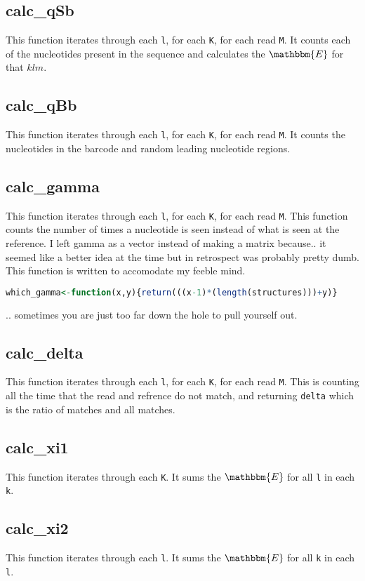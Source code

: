 \documentclass[12pt]{article}
\begin{document}
  \subsection*{calc\_qSb}
This function iterates through each \texttt{l}, for each \texttt{K}, for each read \texttt{M}. It counts each of the nucleotides present in the sequence and calculates the $\mathbbm{E}$ for that $klm$.
  \subsection*{calc\_qBb}
This function iterates through each \texttt{l}, for each \texttt{K}, for each read \texttt{M}. It counts the nucleotides in the barcode and random leading nucleotide regions.
  \subsection*{calc\_gamma}
This function iterates through each \texttt{l}, for each \texttt{K}, for each read \texttt{M}. This function counts the number of times a nucleotide is seen instead of what is seen at the reference. I left gamma as a vector instead of making a matrix because.. it seemed like a better idea at the time but in retrospect was probably pretty dumb. This function is written to  accomodate my feeble mind.
  \begin{lstlisting}[language=R]
which_gamma<-function(x,y){return(((x-1)*(length(structures)))+y)}
  \end{lstlisting}
.. sometimes you are just too far down the hole to pull yourself out.
  \subsection*{calc\_delta}
This function iterates through each \texttt{l}, for each \texttt{K}, for each read \texttt{M}. This is counting all the time that the read and refrence do not match, and returning \texttt{delta} which is the ratio of matches and all matches.
  \subsection*{calc\_xi1}
This function iterates through each \texttt{K}. It sums the $\mathbbm{E}$ for all \texttt{l} in each \texttt{k}.
  \subsection*{calc\_xi2}
This function iterates through each \texttt{l}. It sums the $\mathbbm{E}$ for all \texttt{k} in each \texttt{l}.
\end{document}
